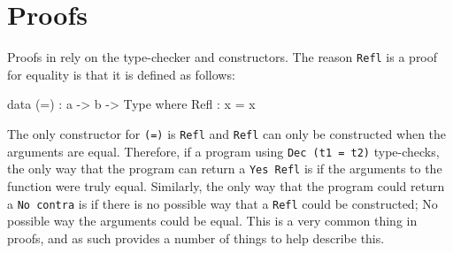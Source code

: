 \section{Proofs}
    Proofs in \Idris rely on the type-checker and constructors. The reason \texttt{Refl} is a proof for equality is that it is defined as follows:
    \begin{code}[caption={Reflexivity as defined in the \Idris prelude \cite{brady_2017}}]
        data (=) : a -> b -> Type where
            Refl : x = x
    \end{code}
    The only constructor for \texttt{(=)} is \texttt{Refl} and \texttt{Refl} can only be constructed when the arguments are equal. Therefore, if a program using \texttt{Dec (t1 = t2)} type-checks, the only way that the program can return a \texttt{Yes Refl} is if the arguments to the function were truly equal. Similarly, the only way that the program could return a \texttt{No contra} is if there is no possible way that a \texttt{Refl} could be constructed; No possible way the arguments could be equal. This is a very common thing in proofs, and as such \Idris provides a number of things to help describe this.
    \\\par
    
